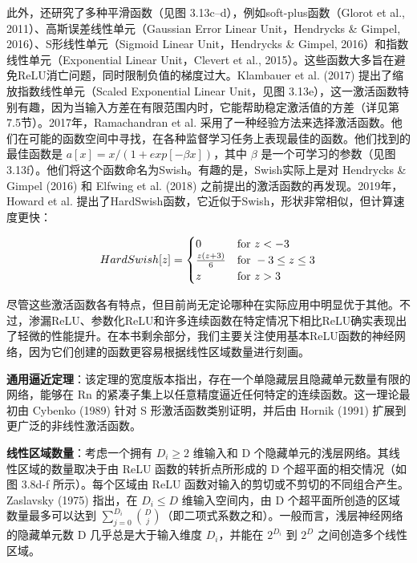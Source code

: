 \documentclass[lang=cn,newtx,10pt,scheme=chinese]{elegantbook}
\begin{document}
此外，还研究了多种平滑函数（见图 3.13c–d），例如soft-plus函数（Glorot et al., 2011）、高斯误差线性单元（Gaussian Error Linear Unit，Hendrycks \& Gimpel, 2016）、S形线性单元（Sigmoid Linear Unit，Hendrycks \& Gimpel, 2016）和指数线性单元（Exponential Linear Unit，Clevert et al., 2015）。这些函数大多旨在避免ReLU消亡问题，同时限制负值的梯度过大。Klambauer et al. (2017) 提出了缩放指数线性单元（Scaled Exponential Linear Unit，见图 3.13e），这一激活函数特别有趣，因为当输入方差在有限范围内时，它能帮助稳定激活值的方差（详见第7.5节）。2017年，Ramachandran et al. 采用了一种经验方法来选择激活函数。他们在可能的函数空间中寻找，在各种监督学习任务上表现最佳的函数。他们找到的最佳函数是 \(a[x] = x/(1 + exp[−\beta x])\)，其中 \(\beta\) 是一个可学习的参数（见图 3.13f）。他们将这个函数命名为Swish。有趣的是，Swish实际上是对 Hendrycks \& Gimpel (2016) 和 Elfwing et al. (2018) 之前提出的激活函数的再发现。2019年，Howard et al. 提出了HardSwish函数，它近似于Swish，形状非常相似，但计算速度更快：

\begin{equation}
HardSwish[z] =
\begin{cases} 
	0 & \text{for } z < -3 \notag \\
	\frac{z(z + 3)}{6} & \text{for } -3 \leq z \leq 3 \notag \\
	z & \text{for } z > 3 
\end{cases} 
\end{equation}

尽管这些激活函数各有特点，但目前尚无定论哪种在实际应用中明显优于其他。不过，渗漏ReLU、参数化ReLU和许多连续函数在特定情况下相比ReLU确实表现出了轻微的性能提升。在本书剩余部分，我们主要关注使用基本ReLU函数的神经网络，因为它们创建的函数更容易根据线性区域数量进行刻画。

\textbf{通用逼近定理}：该定理的宽度版本指出，存在一个单隐藏层且隐藏单元数量有限的网络，能够在 Rn 的紧凑子集上以任意精度逼近任何特定的连续函数。这一理论最初由 Cybenko (1989) 针对 S 形激活函数类别证明，并后由 Hornik (1991) 扩展到更广泛的非线性激活函数。

\textbf{线性区域数量}：考虑一个拥有 \(D_i \geq 2\) 维输入和 D 个隐藏单元的浅层网络。其线性区域的数量取决于由 ReLU 函数的转折点所形成的 D 个超平面的相交情况（如图 3.8d-f 所示）。每个区域由 ReLU 函数对输入的剪切或不剪切的不同组合产生。Zaslavsky (1975) 指出，在 \(D_i \leq D\) 维输入空间内，由 D 个超平面所创造的区域数量最多可以达到 \(\sum_{j=0}^{D_i} \binom{D}{j}\)（即二项式系数之和）。一般而言，浅层神经网络的隐藏单元数 D 几乎总是大于输入维度 \(D_i\)，并能在 \(2^{D_i}\) 到 \(2^D\) 之间创造多个线性区域。
\end{document}
